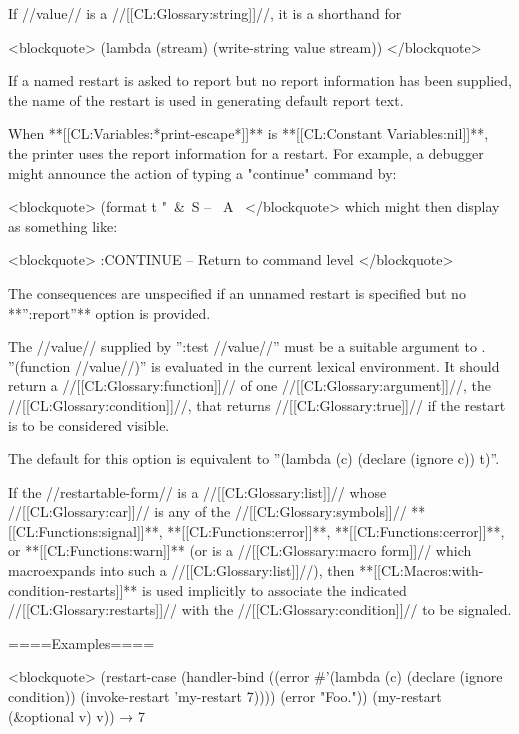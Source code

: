 If //value// is a //[[CL:Glossary:string]]//, it is a shorthand for

<blockquote> (lambda (stream) (write-string value stream)) </blockquote>

If a named restart is asked to report but no report information has been supplied, the name of the restart is used in generating default report text.

When **[[CL:Variables:*print-escape*]]** is **[[CL:Constant Variables:nil]]**, the printer uses the report information for a restart. For example, a debugger might announce the action of typing a "continue" command by:

<blockquote> (format t "~&~S -- ~A~ </blockquote> which might then display as something like:

<blockquote> :CONTINUE -- Return to command level </blockquote>

The consequences are unspecified if an unnamed restart is specified but no **'':report''** option is provided.


The //value// supplied by '':test //value//'' must be a suitable argument to . ''(function //value//)'' is evaluated in the current lexical environment. It should return a //[[CL:Glossary:function]]// of one //[[CL:Glossary:argument]]//, the //[[CL:Glossary:condition]]//, that returns //[[CL:Glossary:true]]// if the restart is to be considered visible.

The default for this option is equivalent to ''(lambda (c) (declare (ignore c)) t)''.

\endlist

If the //restartable-form// is a //[[CL:Glossary:list]]// whose //[[CL:Glossary:car]]// is any of the //[[CL:Glossary:symbols]]// **[[CL:Functions:signal]]**, **[[CL:Functions:error]]**, **[[CL:Functions:cerror]]**, or **[[CL:Functions:warn]]** (or is a //[[CL:Glossary:macro form]]// which macroexpands into such a //[[CL:Glossary:list]]//), then **[[CL:Macros:with-condition-restarts]]** is used implicitly to associate the indicated //[[CL:Glossary:restarts]]// with the //[[CL:Glossary:condition]]// to be signaled.

====Examples====

<blockquote> (restart-case (handler-bind ((error #'(lambda (c) (declare (ignore condition)) (invoke-restart 'my-restart 7)))) (error "Foo.")) (my-restart (&optional v) v)) → 7


